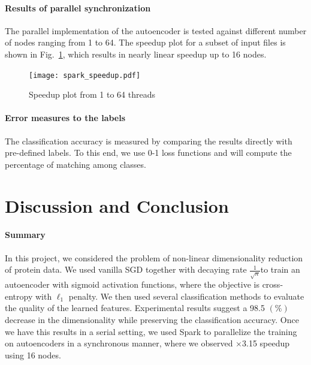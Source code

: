 \documentclass{article}
\begin{document}
\paragraph{Results of parallel synchronization} The parallel implementation of the autoencoder is tested against different number of nodes ranging from 1 to 64. The speedup plot for a subset of input files is shown in Fig.~\ref{fig:spark_speedup}, which results in nearly linear speedup up to 16 nodes. 

\begin{figure}
  \caption{Speedup plot from 1 to 64 threads}
  \centering
  \texttt{[image: spark\_speedup.pdf]}
  \label{fig:spark_speedup}
\end{figure}

\paragraph{Error measures to the labels} The classification accuracy is measured by comparing the results directly with pre-defined labels. To this end, we use 0-1 loss functions and will compute the percentage of matching among classes.


\section{Discussion and Conclusion}
\paragraph{Summary} In this project, we considered the problem of non-linear dimensionality reduction of protein data. We used vanilla SGD together with decaying rate $\frac{1}{\sqrt{n}}$to train an autoencoder with sigmoid activation functions, where the objective is cross-entropy with $\ell_1$ penalty. We then used several classification methods to evaluate the quality of the learned features. Experimental results suggest a 98.5 $(\%)$ decrease in the dimensionality while preserving the classification accuracy. Once we have this results in a serial setting, we used Spark to parallelize the training on autoencoders in a synchronous manner, where we observed $\times$3.15 speedup using 16 nodes.
\end{document}
